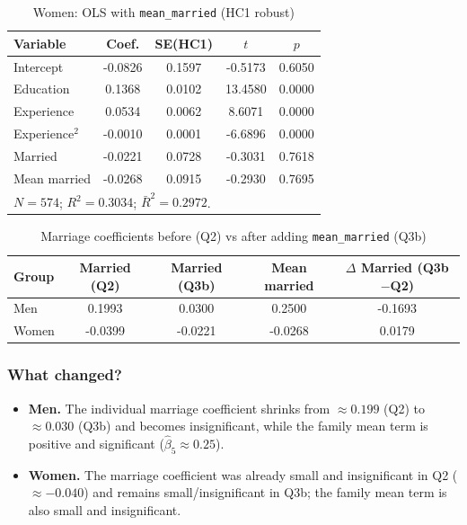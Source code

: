 \documentclass[12pt]{article}
\begin{document}
\begin{table}[htbp]
  \centering
  \caption{Women: OLS with \texttt{mean\_married} (HC1 robust)}
  \label{tab:q3b_women}
  \small
  \begin{tabular}{l
                  S[table-format=1.4]
                  S[table-format=1.4]
                  S[table-format=2.4]
                  S[table-format=1.4]}
    \toprule
    Variable & {Coef.} & {SE(HC1)} & {$t$} & {$p$} \\
    \midrule
    Intercept         & -0.0826 & 0.1597 & -0.5173 & 0.6050 \\
    Education         & 0.1368  & 0.0102 & 13.4580 & 0.0000 \\
    Experience        & 0.0534  & 0.0062 &  8.6071 & 0.0000 \\
    Experience$^{2}$  & -0.0010 & 0.0001 & -6.6896 & 0.0000 \\
    Married           & -0.0221 & 0.0728 & -0.3031 & 0.7618 \\
    Mean married      & -0.0268 & 0.0915 & -0.2930 & 0.7695 \\
    \midrule
     \\
    \bottomrule
  \end{tabular}
\end{table}

\begin{table}[htbp]
  \centering
  \caption{Marriage coefficients before (Q2) vs after adding \texttt{mean\_married} (Q3b)}
  \label{tab:q3b_compare}
  \small
  \begin{tabular}{l
                  S[table-format=1.4]
                  S[table-format=1.4]
                  S[table-format=1.4]
                  S[table-format=+1.4]}
    \toprule
    Group & {Married (Q2)} & {Married (Q3b)} & {Mean married} & {$\Delta$ Married (Q3b$-$Q2)} \\
    \midrule
    Men    & 0.1993 & 0.0300 & 0.2500 & -0.1693 \\
    Women  & -0.0399 & -0.0221 & -0.0268 & 0.0179 \\
    \bottomrule
  \end{tabular}
\end{table}

\subsubsection*{What changed?}
\begin{itemize}[leftmargin=1.25em]
  \item \textbf{Men.} The individual marriage coefficient shrinks from \(\approx 0.199\) (Q2) to \(\approx 0.030\) (Q3b) and becomes insignificant, while the family mean term is positive and significant (\(\widehat\beta_5\approx 0.25\)).
  \item \textbf{Women.} The marriage coefficient was already small and insignificant in Q2 (\(\approx -0.040\)) and remains small/insignificant in Q3b; the family mean term is also small and insignificant.
\end{itemize}
\end{document}
